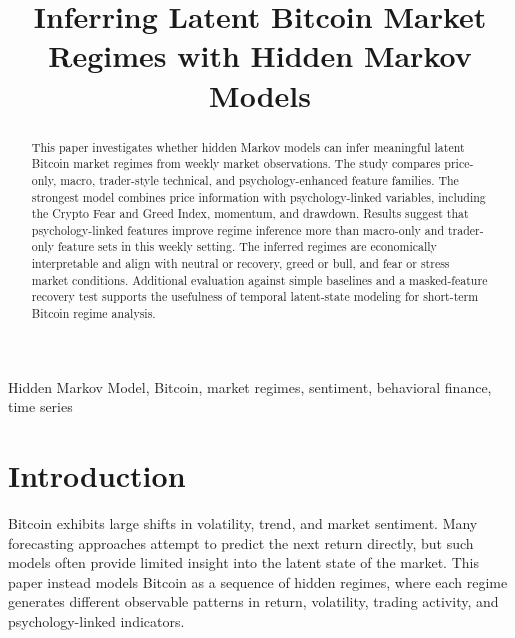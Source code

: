 \documentclass[conference]{IEEEtran}
\begin{document}
\title{Inferring Latent Bitcoin Market Regimes with Hidden Markov Models}

\author{
}

\maketitle

\begin{abstract}
This paper investigates whether hidden Markov models can infer meaningful latent Bitcoin market regimes from weekly market observations. The study compares price-only, macro, trader-style technical, and psychology-enhanced feature families. The strongest model combines price information with psychology-linked variables, including the Crypto Fear and Greed Index, momentum, and drawdown. Results suggest that psychology-linked features improve regime inference more than macro-only and trader-only feature sets in this weekly setting. The inferred regimes are economically interpretable and align with neutral or recovery, greed or bull, and fear or stress market conditions. Additional evaluation against simple baselines and a masked-feature recovery test supports the usefulness of temporal latent-state modeling for short-term Bitcoin regime analysis.
\end{abstract}

\begin{IEEEkeywords}
Hidden Markov Model, Bitcoin, market regimes, sentiment, behavioral finance, time series
\end{IEEEkeywords}

\section{Introduction}
Bitcoin exhibits large shifts in volatility, trend, and market sentiment. Many forecasting approaches attempt to predict the next return directly, but such models often provide limited insight into the latent state of the market. This paper instead models Bitcoin as a sequence of hidden regimes, where each regime generates different observable patterns in return, volatility, trading activity, and psychology-linked indicators.
\end{document}
